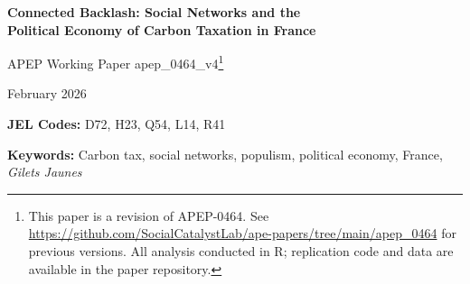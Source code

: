 \documentclass[12pt]{article}
\newcommand{\rn}{Rassemblement National}
\newcommand{\dept}{d\'{e}partement}
\newcommand{\depts}{d\'{e}partements}
\begin{document}

\begin{titlepage}
\begin{center}
\vspace*{1cm}

{\LARGE\bfseries Connected Backlash: Social Networks and the\\
Political Economy of Carbon Taxation in France}

\vspace{1cm}

{\large APEP Working Paper apep\_0464\_v4\footnote{This paper is a revision of APEP-0464. See \url{https://github.com/SocialCatalystLab/ape-papers/tree/main/apep_0464} for previous versions. All analysis conducted in R; replication code and data are available in the paper repository.}}

\vspace{0.5cm}

{\large February 2026}

\vspace{1cm}

\begin{abstract}
\noindent On November 17, 2018, 300,000 French citizens donned yellow vests to protest a carbon tax---but protests spread far beyond where the tax hit hardest. This paper shows social networks transmitted the backlash through multiple channels. Using Facebook's Social Connectedness Index to measure ties between French \depts{}, I construct shift-share measures of network exposure to fuel-vulnerable and immigrant-connected communities. At the \dept{}-level ($N = 960$), network fuel exposure raises \rn{} vote share by 1.35 percentage points after the carbon tax (reduced-form composite). A horse-race decomposition reveals that both fuel vulnerability and immigration attitudes propagate through social networks: the fuel-specific component is 0.58~pp ($p = 0.07$) while SCI-weighted immigration exposure contributes $-1.41$~pp ($p < 0.01$). An event study shows a structural break at 2014. The effect is absent for Green and center-right parties and robust to a pre-treatment migration-based network proxy.
\end{abstract}

\vspace{0.3cm}

\textbf{JEL Codes:} D72, H23, Q54, L14, R41

\textbf{Keywords:} Carbon tax, social networks, populism, political economy, France, \textit{Gilets Jaunes}

\end{center}
\end{titlepage}
\end{document}

